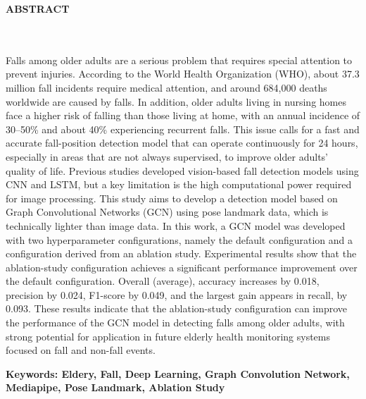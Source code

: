 \clearpage
{}%
\thispagestyle{fancy}

\begin{center}
	\large \bfseries \MakeUppercase{Abstract}\\
	\normalsize \normalfont {\thetitleEN}\\
	\normalsize \normalfont {\theauthor}\\
	\bigskip
	
	\normalsize \normalfont \justifying \singlespacing
	Falls among older adults are a serious problem that requires special attention to prevent injuries. According to the World Health Organization (WHO), about 37.3 million fall incidents require medical attention, and around 684,000 deaths worldwide are caused by falls. In addition, older adults living in nursing homes face a higher risk of falling than those living at home, with an annual incidence of 30--50\% and about 40\% experiencing recurrent falls. This issue calls for a fast and accurate fall-position detection model that can operate continuously for 24 hours, especially in areas that are not always supervised, to improve older adults' quality of life. Previous studies developed vision-based fall detection models using CNN and LSTM, but a key limitation is the high computational power required for image processing. This study aims to develop a detection model based on Graph Convolutional Networks (GCN) using pose landmark data, which is technically lighter than image data. In this work, a GCN model was developed with two hyperparameter configurations, namely the default configuration and a configuration derived from an ablation study. Experimental results show that the ablation-study configuration achieves a significant performance improvement over the default configuration. Overall (average), accuracy increases by 0.018, precision by 0.024, F1-score by 0.049, and the largest gain appears in recall, by 0.093. These results indicate that the ablation-study configuration can improve the performance of the GCN model in detecting falls among older adults, with strong potential for application in future elderly health monitoring systems focused on fall and non-fall events.
    \vspace{20pt}
	
	\textbf{Keywords: Eldery, Fall, Deep Learning, Graph Convolution Network, Mediapipe, Pose Landmark, Ablation Study}
	
	\vfill
	
\end{center}
\clearpage